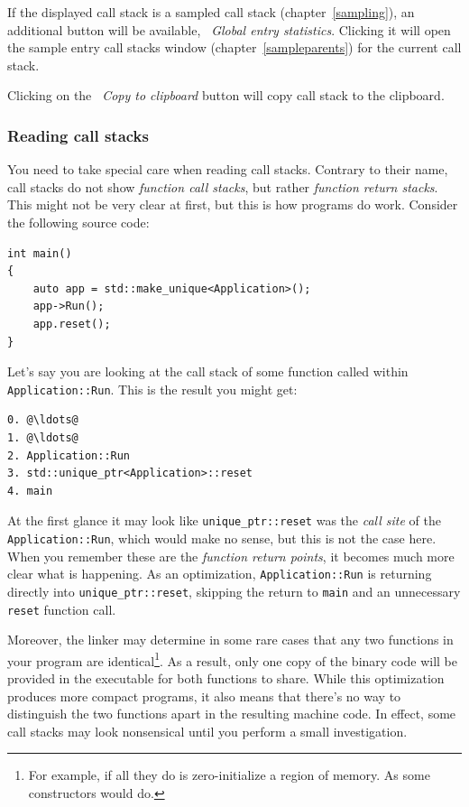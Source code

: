 \documentclass[hidelinks,titlepage,a4paper]{article}
\begin{document}
If the displayed call stack is a sampled call stack (chapter~\ref{sampling}), an additional button will be available, \emph{\faDoorOpen{}~Global entry statistics}. Clicking it will open the sample entry call stacks window (chapter~\ref{sampleparents}) for the current call stack.

Clicking on the \emph{\faClipboard{}~Copy to clipboard} button will copy call stack to the clipboard.

\subsubsection{Reading call stacks}
\label{readingcallstacks}

You need to take special care when reading call stacks. Contrary to their name, call stacks do not show \emph{function call stacks}, but rather \emph{function return stacks}. This might not be very clear at first, but this is how programs do work. Consider the following source code:

\begin{lstlisting}
int main()
{
    auto app = std::make_unique<Application>();
    app->Run();
    app.reset();
}
\end{lstlisting}

Let's say you are looking at the call stack of some function called within \texttt{Application::Run}. This is the result you might get:

\begin{lstlisting}
0. @\ldots@
1. @\ldots@
2. Application::Run
3. std::unique_ptr<Application>::reset
4. main
\end{lstlisting}

At the first glance it may look like \texttt{unique\_ptr::reset} was the \emph{call site} of the \texttt{Application::Run}, which would make no sense, but this is not the case here. When you remember these are the \emph{function return points}, it becomes much more clear what is happening. As an optimization, \texttt{Application::Run} is returning directly into \texttt{unique\_ptr::reset}, skipping the return to \texttt{main} and an unnecessary \texttt{reset} function call.

Moreover, the linker may determine in some rare cases that any two functions in your program are identical\footnote{For example, if all they do is zero-initialize a region of memory. As some constructors would do.}. As a result, only one copy of the binary code will be provided in the executable for both functions to share. While this optimization produces more compact programs, it also means that there's no way to distinguish the two functions apart in the resulting machine code. In effect, some call stacks may look nonsensical until you perform a small investigation.
\end{document}
